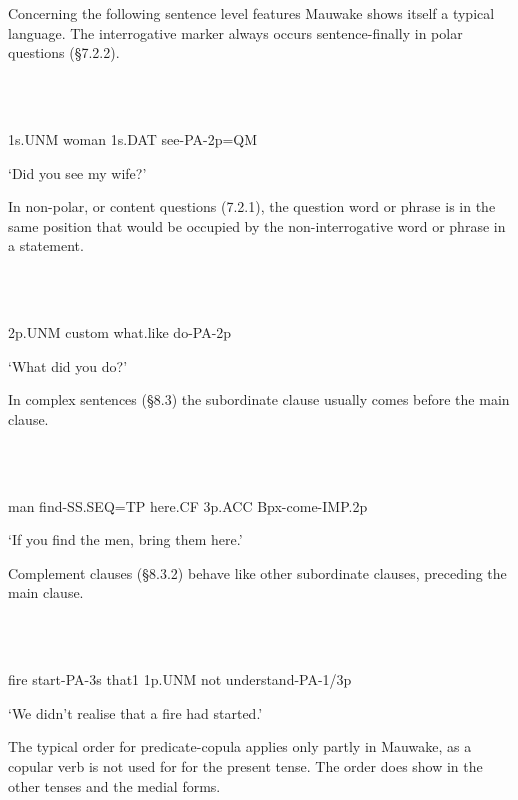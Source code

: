 Concerning the following sentence level features Mauwake shows itself a typical  language.  The interrogative marker \emphs{{}-}  always occurs sentence-finally in polar questions ({\S}7.2.2).

\ea%
\label{ex:x672}
\gll {}\emphs{=} \\
      \\
\glt
\z

1s.UNM  woman  1s.DAT  see-PA-2p=QM

`Did you see my wife?'

In non-polar, or content questions (7.2.1), the question word or phrase is in the same position that would be occupied by the non-interrogative word or phrase in a statement.

\ea%
\label{ex:x673}
\gll {}  \\
      \\
\glt
\z

2p.UNM  custom  what.like  do-PA-2p

`What did you do?'

In complex sentences ({\S}8.3) the subordinate clause usually comes before the main clause.

\ea%
\label{ex:x674}
\gll {} \\
      \\
\glt
\z

man  find-SS.SEQ=TP  here.CF  3p.ACC  Bpx-come-IMP.2p

`If you find the men, bring them here.'

Complement clauses ({\S}8.3.2) behave like other subordinate clauses, preceding the main clause. 

\ea%
\label{ex:x675}
\gll {} \\
      \\
\glt
\z

fire  start-PA-3s  that1  1p.UNM  not  understand-PA-1/3p

`We didn't realise that a fire had started.'

The typical  order for predicate-copula applies only partly in Mauwake, as a copular verb is not used for for the present tense. The  order does show in the other tenses and the medial forms.


